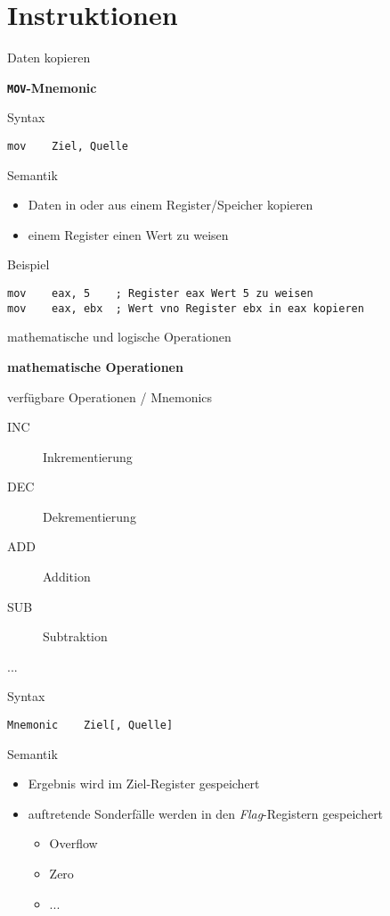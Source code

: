 \section{Instruktionen}

\begin{frame}[fragile]{Daten kopieren}

\begin{center}
\textbf{\texttt{MOV}-Mnemonic}
\end{center}

Syntax
\begin{lstlisting}
mov    Ziel, Quelle
\end{lstlisting}

\makebox{}

Semantik
\begin{itemize}
	\item Daten in oder aus einem Register/Speicher kopieren
	\item einem Register einen Wert zu weisen
\end{itemize}

\makebox{}

Beispiel
\begin{lstlisting}
mov    eax, 5    ; Register eax Wert 5 zu weisen
mov    eax, ebx  ; Wert vno Register ebx in eax kopieren
\end{lstlisting}

\end{frame}

\begin{frame}[fragile]{mathematische und logische Operationen}

\begin{center}
\textbf{mathematische Operationen}
\end{center}

verfügbare Operationen / Mnemonics
\begin{description}
	\item [INC] Inkrementierung
	\item [DEC] Dekrementierung
	\item [ADD] Addition
	\item [SUB] Subtraktion
	\item [...]
\end{description}

\makebox{}

Syntax
\begin{lstlisting}
Mnemonic    Ziel[, Quelle]
\end{lstlisting}

\makebox{}

Semantik
\begin{itemize}
	\item Ergebnis wird im Ziel-Register gespeichert

	\item auftretende Sonderfälle werden in den \textit{Flag}-Registern gespeichert
	\begin{itemize}
		\item Overflow
		\item Zero
		\item ...
	\end{itemize}
\end{itemize}
\end{frame}

